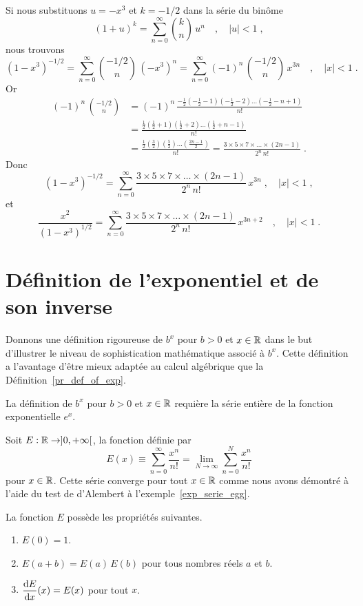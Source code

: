 {\begin{egg}
Si nous substituons $u=-x^3$ et $k=-1/2$ dans la série du binôme
\[
(1+u)^k = \sum_{n=0}^\infty \binom{k}{n} \, u^n \quad , \quad |u|<1 \; ,
\]
nous trouvons
\[
(1-x^3)^{-1/2} = \sum_{n=0}^\infty \binom{-1/2}{n} \, (-x^3)^n
= \sum_{n=0}^\infty (-1)^n\,\binom{-1/2}{n} \, x^{3n} \quad ,
\quad |x|<1 \; .
\]
Or
\begin{align*}
(-1)^n\,\binom{-1/2}{n} &=
(-1)^n\,\frac{-\frac{1}{2}\left(-\frac{1}{2}-1\right)
\left(-\frac{1}{2}-2\right)\ldots\left(-\frac{1}{2}-n+1\right)}{n!} \\
&= \frac{\frac{1}{2}\left(\frac{1}{2}+1\right)\left(\frac{1}{2}+2\right)\ldots
\left(\frac{1}{2}+n-1\right)}{n!} \\
&= \frac{\frac{1}{2}\left(\frac{3}{2}\right)\left(\frac{5}{2}\right)\ldots
\left(\frac{2n-1}{2}\right)}{n!}
= \frac{3\times 5 \times 7 \times \ldots \times (2n-1)}{2^n\,n!} \; .
\end{align*}
Donc
\[
(1-x^3)^{-1/2} = \sum_{n=0}^\infty
\frac{3\times 5 \times 7 \times \ldots \times (2n-1)}{2^n\,n!} \, x^{3n} \; ,
\quad |x|<1 \; ,
\]
et
\[
\frac{x^2}{(1-x^3)^{1/2}} = \sum_{n=0}^\infty
\frac{3\times 5 \times 7 \times \ldots \times (2n-1)}{2^n\,n!} \, x^{3n+2}
\quad , \quad |x|<1 \; .
\]
\end{egg}

\section{Définition de l'exponentiel et de son inverse \theory}\label{DEFofE}

Donnons une définition rigoureuse de $b^x$ pour $b>0$ et
$x\in \mathbb{R}$ dans le but d'illustrer le niveau de sophistication mathématique
associé à $b^x$.  Cette définition a l'avantage d'être mieux adaptée au
calcul algébrique que la Définition~\ref{pr_def_of_exp}. 

La définition de $b^x$ pour $b>0$ et $x\in \mathbb{R}$ requière la série entière de
la fonction exponentielle $e^x$.

\begin{prop}
Soit $E: \mathbb{R} \rightarrow ]0,+\infty[$, la fonction définie par
\[
E(x) \equiv \sum_{n=0}^\infty \frac{x^n}{n!}
= \lim_{N\rightarrow \infty} \sum_{n=0}^N \frac{x^n}{n!}
\]
pour $x\in \mathbb{R}$.  Cette série converge pour tout $x\in \mathbb{R}$ comme nous
avons démontré à l'aide du test de d'Alembert à
l'exemple~\ref{exp_serie_egg}.

La fonction $E$ possède les propriétés suivantes.
\begin{enumerate}
\item $E(0)=1$.
\item $E(a+b) = E(a)\, E(b)$ pour tous nombres réels $a$ et $b$.
\item $\displaystyle \frac{\mathrm{d}E}{\mathrm{d}x}(x) = E(x)$ pour tout $x$.
\end{enumerate}
\end{prop}

}
